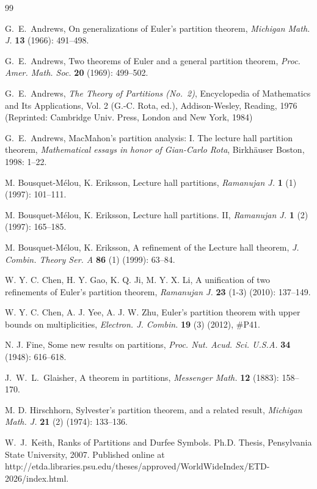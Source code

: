\documentclass[11pt,reqno]{amsart}
\numberwithin{equation}{section}
\theoremstyle{plain}
\theoremstyle{definition}
\begin{document}
\begin{thebibliography}{99}

 G.~E.~Andrews, On generalizations of Euler's partition theorem, \textit{Michigan Math. J.} \textbf{13} (1966): 491--498.

 G.~E.~Andrews, Two theorems of Euler and a general partition theorem, \textit{Proc. Amer. Math. Soc.} \textbf{20} (1969): 499--502.

 G.~E.~Andrews, \emph{The Theory of Partitions (No.~2)}, Encyclopedia of Mathematics and Its Applications, Vol. 2 (G.-C. Rota, ed.), Addison-Wesley, Reading, 1976 (Reprinted: Cambridge Univ. Press, London and New York, 1984)

 G.~E.~Andrews, MacMahon's partition analysis: I. The lecture hall partition theorem, \emph{Mathematical essays in honor of Gian-Carlo Rota}, Birkh\"auser Boston, 1998: 1--22.

 M. Bousquet-M\'elou, K. Eriksson, Lecture hall partitions, \textit{Ramanujan J.} \textbf{1} (1) (1997): 101--111.

 M. Bousquet-M\'elou, K. Eriksson, Lecture hall partitions. II, \textit{Ramanujan J.} \textbf{1} (2) (1997): 165--185.

 M. Bousquet-M\'elou, K. Eriksson, A refinement of the Lecture hall theorem, \textit{J. Combin. Theory Ser. A} \textbf{86} (1) (1999): 63--84.

 W. Y. C. Chen, H. Y. Gao, K. Q. Ji, M. Y. X. Li, A unification of two refinements of Euler's partition theorem, \textit{Ramanujan J.} \textbf{23} (1-3) (2010): 137--149.

 W. Y. C. Chen, A. J. Yee, A. J. W. Zhu, Euler's partition theorem with upper bounds on multiplicities, \textit{Electron. J. Combin.} \textbf{19} (3) (2012), \#P41.

 N. J. Fine, Some new results on partitions, \textit{Proc. Nut. Acud. Sci. U.S.A.} \textbf{34} (1948): 616--618.

J.~W.~L.~Glaisher, A theorem in partitions, \textit{Messenger Math.} {\bf 12} (1883): 158--170.

 M. D. Hirschhorn, Sylvester's partition theorem, and a related result, \textit{Michigan Math. J.} \textbf{21} (2) (1974): 133--136.

 W.~J.~Keith, Ranks of Partitions and Durfee Symbols. Ph.D. Thesis, Pensylvania State University, 2007. Published online at http://etda.libraries.psu.edu/theses/approved/WorldWideIndex/ETD-2026/index.html.


\end{thebibliography}
\end{document}
